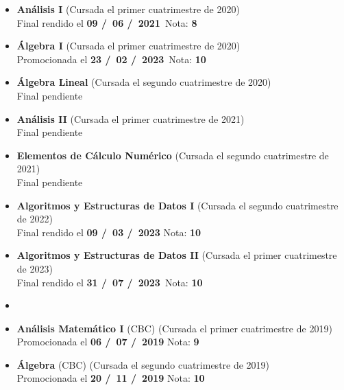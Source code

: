 \begin{itemize}[leftmargin=0.8cm]

  \item{\textbf{Análisis I} (Cursada el primer cuatrimestre de 2020)\\
  Final rendido el \textbf{09 \slash \ 06 \slash \ 2021}\  \hfill Nota: \textbf{8}}

  \item{\textbf{Álgebra I} (Cursada el primer cuatrimestre de 2020)\\
  Promocionada el \textbf{23 \slash \ 02 \slash \ 2023}\  \hfill Nota: \textbf{10}}

  \item{\textbf{Álgebra Lineal} (Cursada el segundo cuatrimestre de 2020)\\
  Final pendiente}

  \item{\textbf{Análisis II} (Cursada el primer cuatrimestre de 2021)\\
  Final pendiente}

  \item{\textbf{Elementos de Cálculo Numérico} (Cursada el segundo cuatrimestre de 2021)\\
  Final pendiente}

  \item{\textbf{Algoritmos y Estructuras de Datos I} (Cursada el segundo cuatrimestre de 2022)\\
  Final rendido el \textbf{09 \slash \ 03 \slash \ 2023} \hfill Nota: \textbf{10}}

  \item{\textbf{Algoritmos y Estructuras de Datos II} (Cursada el primer cuatrimestre de 2023)\\
  Final rendido el \textbf{31 \slash \ 07 \slash \ 2023}\  \hfill Nota: \textbf{10}}


  \item[] %

  \item{\textbf{Análisis Matemático I} (CBC) (Cursada el primer cuatrimestre de 2019)\\
  Promocionada el \textbf{06 \slash \ 07 \slash \ 2019} \hfill Nota: \textbf{9}}

  \item{\textbf{Álgebra} (CBC) (Cursada el segundo cuatrimestre de 2019)\\
  Promocionada el \textbf{20 \slash \ 11 \slash \ 2019} \hfill Nota: \textbf{10}}


\end{itemize}
